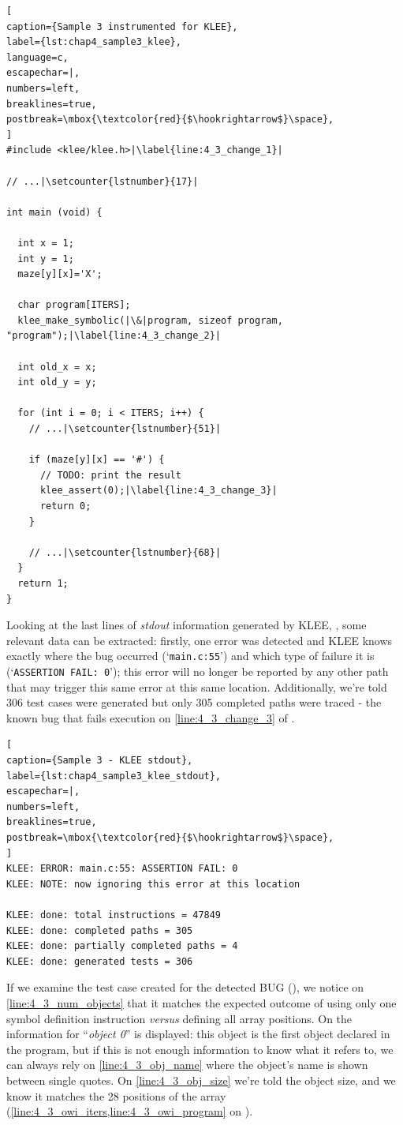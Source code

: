 \begin{lstlisting}[
caption={Sample 3 instrumented for KLEE},
label={lst:chap4_sample3_klee},
language=c,
escapechar=|,
numbers=left,
breaklines=true,
postbreak=\mbox{\textcolor{red}{$\hookrightarrow$}\space},
]
#include <klee/klee.h>|\label{line:4_3_change_1}|

// ...|\setcounter{lstnumber}{17}|

int main (void) {

  int x = 1;
  int y = 1;
  maze[y][x]='X';

  char program[ITERS];
  klee_make_symbolic(|\&|program, sizeof program, "program");|\label{line:4_3_change_2}|

  int old_x = x;
  int old_y = y;

  for (int i = 0; i < ITERS; i++) {
    // ...|\setcounter{lstnumber}{51}|

    if (maze[y][x] == '#') {
      // TODO: print the result
      klee_assert(0);|\label{line:4_3_change_3}|
      return 0;
    }

    // ...|\setcounter{lstnumber}{68}|
  }
  return 1;
}
\end{lstlisting}

Looking at the last lines of \textit{stdout} information generated by KLEE, , some relevant data can be extracted: firstly, one error was detected and KLEE knows exactly where the bug occurred (`\verb$main.c:55$') and which type of failure it is (`\verb$ASSERTION FAIL: 0$'); this error will no longer be reported by any other path that may trigger this same error at this same location. Additionally, we're told 306 test cases were generated but only 305 completed paths were traced - the known bug that fails execution on \cref{line:4_3_change_3} of .

\begin{lstlisting}[
caption={Sample 3 - KLEE stdout},
label={lst:chap4_sample3_klee_stdout},
escapechar=|,
numbers=left,
breaklines=true,
postbreak=\mbox{\textcolor{red}{$\hookrightarrow$}\space},
]
KLEE: ERROR: main.c:55: ASSERTION FAIL: 0
KLEE: NOTE: now ignoring this error at this location

KLEE: done: total instructions = 47849
KLEE: done: completed paths = 305
KLEE: done: partially completed paths = 4
KLEE: done: generated tests = 306
\end{lstlisting}

If we examine the test case created for the detected BUG (), we notice on \cref{line:4_3_num_objects} that it matches the expected outcome of using only one symbol definition instruction \textit{versus} defining all array positions. On  the information for ``\textit{object 0}'' is displayed: this object is the first object declared in the program, but if this is not enough information to know what it refers to, we can always rely on \cref{line:4_3_obj_name} where the object's name is shown between single quotes. On \cref{line:4_3_obj_size} we're told the object size, and we know it matches the 28 positions of the array (\cref{line:4_3_owi_iters,line:4_3_owi_program} on ).

